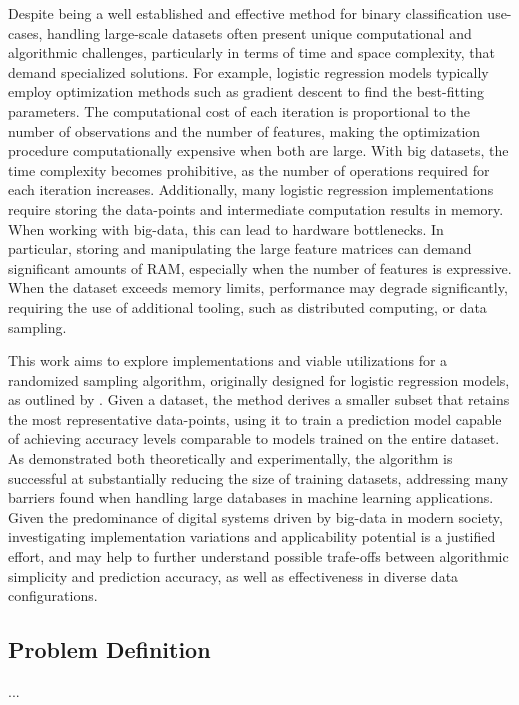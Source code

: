 \documentclass{article}
\theoremstyle{plain}
\theoremstyle{definition}
\theoremstyle{remark}
\begin{document}
Despite being a well established and effective method for binary classification use-cases, handling large-scale datasets often present unique computational and algorithmic challenges, particularly in terms of time and space complexity, that demand specialized solutions. For example, logistic regression models typically employ optimization methods such as gradient descent to find the best-fitting parameters. The computational cost of each iteration is proportional to the number of observations and the number of features, making the optimization procedure computationally expensive when both are large. With big datasets, the time complexity becomes prohibitive, as the number of operations required for each iteration increases. Additionally, many logistic regression implementations require storing the data-points and intermediate computation results in memory. When working with big-data, this can lead to hardware bottlenecks. In particular, storing and manipulating the large feature matrices can demand significant amounts of RAM, especially when the number of features is expressive. When the dataset exceeds memory limits, performance may degrade significantly, requiring the use of additional tooling, such as distributed computing, or data sampling.

This work aims to explore implementations and viable utilizations for a randomized sampling algorithm, originally designed for logistic regression models, as outlined by \citet{chow24}. Given a dataset, the method derives a smaller subset that retains the most representative data-points, using it to train a prediction model capable of achieving accuracy levels comparable to models trained on the entire dataset. As demonstrated both theoretically and experimentally, the algorithm is successful at substantially reducing the size of training datasets, addressing many barriers found when handling large databases in machine learning applications. Given the predominance of digital systems driven by big-data in modern society, investigating implementation variations and applicability potential is a justified effort, and may help to further understand possible trafe-offs between algorithmic simplicity and prediction accuracy, as well as effectiveness in diverse data configurations.

\subsection{Problem Definition}

...
\end{document}
